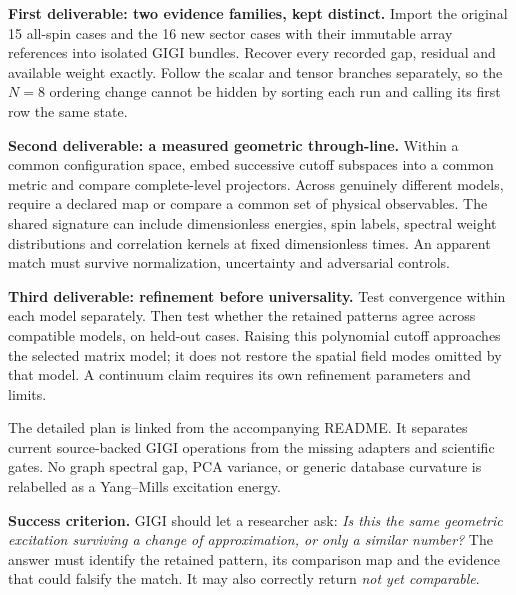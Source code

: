 \documentclass[11pt,letterpaper]{article}
\theoremstyle{plain}
\theoremstyle{definition}
\begin{document}
\textbf{First deliverable: two evidence families, kept distinct.}
Import the original 15 all-spin cases and the 16 new sector cases with their
immutable array references into isolated GIGI bundles. Recover every recorded
gap, residual and available weight exactly. Follow the scalar and tensor
branches separately, so the $N=8$ ordering change cannot be hidden by sorting
each run and calling its first row the same state.

\textbf{Second deliverable: a measured geometric through-line.}
Within a common configuration space, embed successive cutoff subspaces into a
common metric and compare complete-level projectors. Across genuinely different
models, require a declared map or compare a common set of physical observables.
The shared signature can include dimensionless energies, spin labels, spectral
weight distributions and correlation kernels at fixed dimensionless times.
An apparent match must survive normalization, uncertainty and adversarial controls.

\textbf{Third deliverable: refinement before universality.}
Test convergence within each model separately. Then test whether the retained
patterns agree across compatible models, on held-out cases. Raising this
polynomial cutoff approaches the selected matrix model; it does not restore
the spatial field modes omitted by that model. A continuum claim requires its
own refinement parameters and limits.

The detailed plan is linked from the accompanying README.
It separates current source-backed GIGI operations from the missing adapters
and scientific gates. No graph spectral gap, PCA variance, or generic database
curvature is relabelled as a Yang--Mills excitation energy.

\textbf{Success criterion.}
GIGI should let a researcher ask: \emph{Is this the same geometric excitation
surviving a change of approximation, or only a similar number?} The answer must
identify the retained pattern, its comparison map and the evidence that could
falsify the match. It may also correctly return \emph{not yet comparable}.
\end{document}
